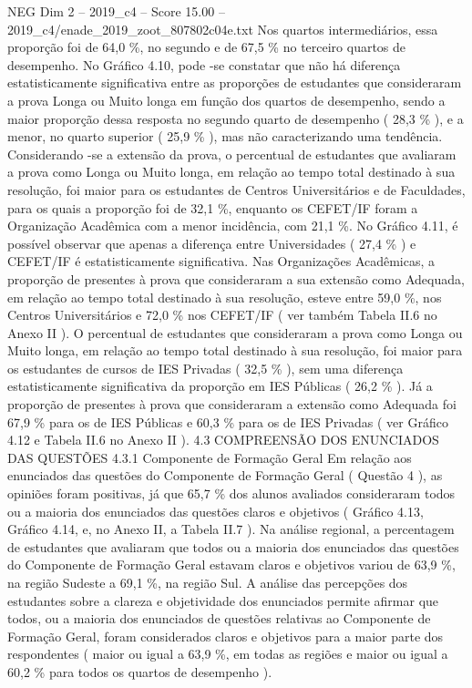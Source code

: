 \begin{textsample}{NEG Dim 2 – 2019\_c4 – Score 15.00 – 2019\_c4/enade\_2019\_zoot\_807802c04e.txt}
Nos quartos intermediários, essa proporção foi de 64,0 \%, no segundo e de 67,5 \% no terceiro quartos de desempenho.
No Gráfico 4.10, pode -se constatar que não há diferença estatisticamente significativa entre as proporções de estudantes que consideraram a prova Longa ou Muito longa em função dos quartos de desempenho, sendo a maior proporção dessa resposta no segundo quarto de desempenho ( 28,3 \% ), e a menor, no quarto superior ( 25,9 \% ), mas não caracterizando uma tendência.
Considerando -se a extensão da prova, o percentual de estudantes que avaliaram a prova como Longa ou Muito longa, em relação ao tempo total destinado à sua resolução, foi maior para os estudantes de Centros Universitários e de Faculdades, para os quais a proporção foi de 32,1 \%, enquanto os CEFET/IF foram a Organização Acadêmica com a menor incidência, com 21,1 \%.
No Gráfico 4.11, é possível observar que apenas a diferença entre Universidades ( 27,4 \% ) e CEFET/IF é estatisticamente significativa.
Nas Organizações Acadêmicas, a proporção de presentes à prova que consideraram a sua extensão como Adequada, em relação ao tempo total destinado à sua resolução, esteve entre 59,0 \%, nos Centros Universitários e 72,0 \% nos CEFET/IF ( ver também Tabela II.6 no Anexo II ).
O percentual de estudantes que consideraram a prova como Longa ou Muito longa, em relação ao tempo total destinado à sua resolução, foi maior para os estudantes de cursos de IES Privadas ( 32,5 \% ), sem uma diferença estatisticamente significativa da proporção em IES Públicas ( 26,2 \% ).
Já a proporção de presentes à prova que consideraram a extensão como Adequada foi 67,9 \% para os de IES Públicas e 60,3 \% para os de IES Privadas ( ver Gráfico 4.12 e Tabela II.6 no Anexo II ). 4.3 COMPREENSÃO DOS ENUNCIADOS DAS QUESTÕES 4.3.1 Componente de Formação Geral Em relação aos enunciados das questões do Componente de Formação Geral ( Questão 4 ), as opiniões foram positivas, já que 65,7 \% dos alunos avaliados consideraram todos ou a maioria dos enunciados das questões claros e objetivos ( Gráfico 4.13, Gráfico 4.14, e, no Anexo II, a Tabela II.7 ).
Na análise regional, a percentagem de estudantes que avaliaram que todos ou a maioria dos enunciados das questões do Componente de Formação Geral estavam claros e objetivos variou de 63,9 \%, na região Sudeste a 69,1 \%, na região Sul.
A análise das percepções dos estudantes sobre a clareza e objetividade dos enunciados permite afirmar que todos, ou a maioria dos enunciados de questões relativas ao Componente de Formação Geral, foram considerados claros e objetivos para a maior parte dos respondentes ( maior ou igual a 63,9 \%, em todas as regiões e maior ou igual a 60,2 \% para todos os quartos de desempenho ).

\end{textsample}

